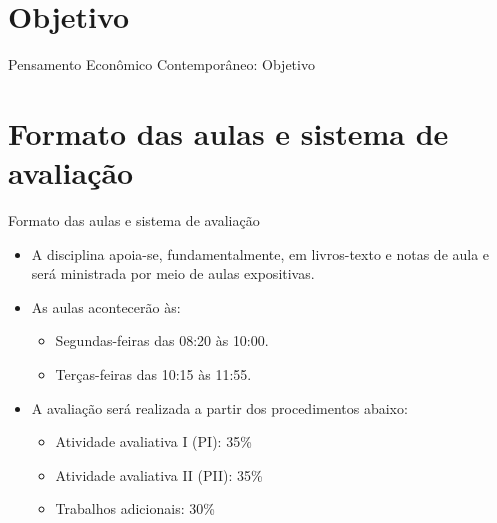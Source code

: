 \documentclass[10pt]{beamer}
\begin{document}
\section{Objetivo}
\begin{frame}{Pensamento Econômico Contemporâneo: Objetivo}
    \begin{center}
        \begin{minipage}{.8\textwidth}
        \end{minipage}
    \end{center}
\end{frame}

\section{Formato das aulas e sistema de avaliação}
\begin{frame}{Formato das aulas e sistema de avaliação}
    \begin{itemize}
        \item A disciplina apoia-se, fundamentalmente, em livros-texto e notas de aula e será ministrada por meio de aulas expositivas.\bigskip

        \item As aulas acontecerão às:\medskip
              \begin{itemize}
                  \item Segundas-feiras das 08:20 às 10:00.\medskip
                  \item Terças-feiras das 10:15 às 11:55.\bigskip
              \end{itemize}

        \item A avaliação será realizada a partir dos procedimentos abaixo:\medskip
              \begin{itemize}
                  \item Atividade avaliativa I (PI): 35\%\medskip
                  \item Atividade avaliativa II (PII): 35\%\medskip                  
                  \item Trabalhos adicionais: 30\%
              \end{itemize}
    \end{itemize}
\end{frame}
\end{document}
